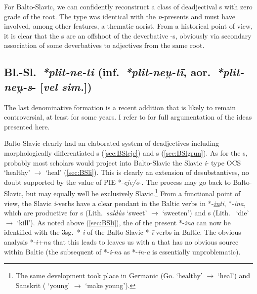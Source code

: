 \documentclass[output=paper,colorlinks,citecolor=brown]{langscibook}
\begin{document}
For Balto-Slavic, we can confidently reconstruct a class of deadjectival s with zero grade of the root. The type was identical with the  \textit{n}-presents  and must have involved, among other features, a thematic aorist. From a historical point of view, it is clear that the  s are an offshoot of the deverbative -s, obviously via secondary association of some deverbatives to adjectives from the same root.

\subsection{Bl.-Sl.\ \textit{*plit-ne-ti} (inf.\ \textit{*plit-neu̯-tī}, aor.\ \textit{*plit-neu̯-s}- [\textit{vel sim.}])}
\label{sec:BSlneu}

The last denominative formation is a recent addition that is likely to remain controversial, at least for some years. I refer to \citet{VillanuevaSvenssonforth} for full argumentation of the ideas presented here.

Balto-Slavic clearly had an elaborated system of deadjectives  including morphologically differentiated s (\ref{sec:BSleje}) and s (\ref{sec:BSlgrun}). As for the s, probably most scholars would project into Balto-Slavic the Slavic \textit{i}- type OCS  ‘healthy’ $\rightarrow$  ‘heal’ (\ref{sec:BSli}). This is clearly an extension of  desubstantives, no doubt supported by the  value of PIE *-\textit{ei̯e/o}-. The process may go back to Balto-Slavic, but may equally well be exclusively Slavic.\footnote{The same development took place in Germanic (Go.  ‘healthy’ $\rightarrow$  ‘heal’) and Sanskrit ( ‘young’ $\rightarrow$  ‘make young’).} From a functional point of view, the Slavic \textit{i}-verbs have a clear pendant in the Baltic verbs in *-\textit{\underline{in}ti}, *-\textit{ina}, which are productive for s (Lith.\ \textit{saldùs} ‘sweet’ $\rightarrow$  ‘sweeten’) and s (Lith.\  ‘die’ $\rightarrow$  ‘kill’). As noted above (\ref{sec:BSli}), the  of the present *-\textit{ina} can now be identified with the 3sg.\ *-\textit{i} of the Balto-Slavic *-\textit{ī}-verbs in Baltic. The obvious analysis *-\textit{i}+\textit{na} that this leads to leaves us with a  that has no obvious source within Baltic (the subsequent  of *-\textit{i}-\textit{na} as *-\textit{in-a} is essentially unproblematic).
\end{document}
